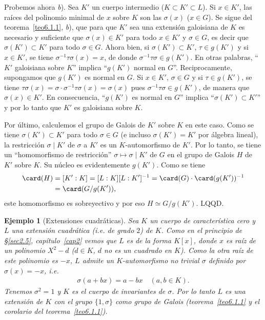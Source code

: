 \documentclass[bibtotoc,leqno,spanish]{amsbook}
\let\emph\relax %
\newcommand{\QED}{LQQD.}
\numberwithin{equation}{section}
\theoremstyle{note}
\theoremstyle{note}
\theoremstyle{rem}
\newtheorem{example}{Ejemplo}
\numberwithin{theorem}{section}
\numberwithin{proposition}{section}
\numberwithin{definition}{section}
\numberwithin{lemma}{section}
\numberwithin{corollary}{section}
\numberwithin{example}{section}
\numberwithin{footnote}{section}%
\begin{document}
Probemos ahora {\itshape b}). Sea $K'$ un cuerpo intermedio ($K\subset K'\subset L$). Si $x\in K'$, las
ra\'ices del polinomio minimal de $x$ sobre $K$ son las $\sigma(x)$ ($x\in G$). Se sigue
del teorema~\ref{teo6.1.1}, {\itshape b}),
que para que $K'$ sea una extensi\'on galoisiana de $K$ es necesario y suficiente
que $\sigma(x)\in K'$
para todo $x\in K'$ y $\sigma\in G$, es decir que $\sigma(K')\subset K'$ para
todo $\sigma\in G$. Ahora bien,
si $\sigma(K')\subset K'$, $\tau\in g(K')$ y si $x\in K'$, se tiene
$\sigma^{-1}\tau\sigma(x) = x$, de donde
$\sigma^{-1}\tau\sigma\in g(K')$. En otras palabras, ``$K'$ galoisiana sobre $K$''
implica ``$g(K')$ normal
en $G$''. Reciprocamente, supongamos que $g(K')$ es normal en $G$. Si $x\in K'$,
$\sigma\in G$ y si
$\tau\in g(K')$, se tiene
$\tau\sigma(x) = \sigma\cdot\sigma^{-1}\tau\sigma(x) = \sigma(x)$ pues
$\sigma^{-1}\tau\sigma\in g(K')$, de manera que $\sigma(x) \in K'$.
En consecuencia, ``$g(K')$ es normal
en $G$'' implica ``$\sigma(K')\subset K'$'' y por lo tanto que $K'$ es galoisiana sobre $K$.

Por \'ultimo, calculemos el grupo de Galois de $K'$ sobre $K$ en este caso. Como se
tiene $\sigma(K')\subset K'$
para todo $\sigma\in G$ (e incluso $\sigma(K') = K'$ por \'algebra lineal), la restricci\'on
$\sigma\mid K'$ de $\sigma$ a $K'$ es un $K$-automorfismo de $K'$. Por lo tanto, se tiene un
``homomorfismo de restricci\'on'' $\sigma\mapsto\sigma\mid K'$ de $G$ en el grupo de
Galois $H$ de $K'$ sobre $K$.
Su n\'ucleo es evidentemente $g(K')$. Como se tiene
\begin{align*}
\card(H) &= [K':K]=[L:K][L:K']^{-1}=\card(G)\cdot\card(g(K'))^{-1}\\
&= \card(G/g(K')),
\end{align*}
este homomorfismo es sobreyectivo y por eso $H\simeq G/g(K')$. \QED

\begin{example}[Extensiones cuadr\'aticas]

Sea $K$ un cuerpo de caracter\'istica cero y $L$ una extensi\'on cuadr\'atica (i.e. de
grado $2$) de $K$.
Como en el principio de \S\ref{sec2.5}, cap\'itulo~\ref{cap2} vemos que $L$ es de la
forma $K[x]$, donde $x$ es
ra\'iz de un polinomio $X^{2}-d$ ($d\in K$, $d$ no es un cuadrado en $K$). Como la otra
ra\'iz de este polinomio
es $-x$, $L$ admite un $K$-automorfismo no trivial $\sigma$ definido por $\sigma(x) = -x$, i.e.
\begin{gather*}
\sigma(a+bx) = a-bx\quad(a,b\in K).
\end{gather*}
Tenemos $\sigma^{2}=1$ y $K$ es el cuerpo de invariantes de $\sigma$.
Por lo tanto $L$ es una extensi\'on
\emph{galoisiana} de $K$ con el grupo \emph{c\'iclico} $\{1,\sigma\}$ como grupo de
Galois (teorema~\ref{teo6.1.1} y el corolario del teorema~\ref{teo6.1.1}).
\end{example}
\end{document}
